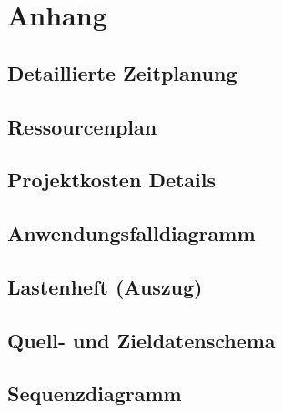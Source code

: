 \documentclass[11pt,toc=sectionentrywithoutdots, headheight=44pt, headings=optiontoheadandtoc]{scrartcl}
\begin{document}
\newpage
\setcounter{secnumdepth}{0}





\label{myLastPage}

\newpage


\setcounter{page}{1}
\setcounter{secnumdepth}{2}
\setcounter{section}{1}
\renewcommand{\thesection}{A}


\ofoot{\thepage}




\section{Anhang}
\subsection{Detaillierte Zeitplanung}
\blindtext

\subsection{Ressourcenplan}
\blindtext\blindtext

\subsection{Projektkosten Details}
\blindtext\blindtext

\subsection{Anwendungsfalldiagramm}
\blindtext\blindtext

\subsection{Lastenheft (Auszug)}
\blindtext\blindtext

\subsection{Quell- und Zieldatenschema}
\blindtext\blindtext

\subsection{Sequenzdiagramm}
\blindtext\blindtext
\end{document}
